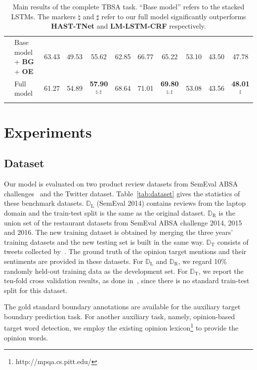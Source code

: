 \documentclass[letterpaper]{article}
\begin{document}
\begin{table}[]
\begin{tabular}{ll|ccc|ccc|ccc}
        & Base model + \textbf{BG} + \textbf{OE} & 63.43 & 49.53 & 55.62 & 62.85 & 66.77 & 65.22 & 53.10 & 43.50 & 47.78 \\
        & Full model & 61.27 & 54.89 & \textbf{57.90}$^{\natural,\sharp}$ & 68.64 & 71.01 & \textbf{69.80}$^{\natural,\sharp}$ & 53.08 & 43.56 & \textbf{48.01}$^{\sharp}$ \\
        \Xhline{3\arrayrulewidth}
    \end{tabular}
    \caption{Main results of the complete TBSA task. ``Base model'' refers to the stacked LSTMs. The markers $\natural$ and $\sharp$ refer to our full model significantly outperforms \textbf{HAST-TNet} and \textbf{LM-LSTM-CRF} respectively.}
    \label{tab:main_results}
\end{table}


\section{Experiments}
\subsection{Dataset}
Our model is evaluated on two product review datasets from SemEval ABSA challenges~\cite{S14-2004,S15-2082,S16-1002} and the Twitter dataset. Table~\ref{tab:dataset} gives the statistics of these benchmark datasets. $\mathbb{D}_{\mathrm{L}}$ (SemEval 2014) contains reviews from the laptop domain and the train-test split is the same as the original dataset. $\mathbb{D}_{\mathrm{R}}$ is the union set of the restaurant datasets from SemEval ABSA challenge 2014, 2015 and 2016. The new training dataset is obtained by merging the three years' training datasets and the new testing set is built in the same way. $\mathbb{D}_{\mathrm{T}}$ consists of tweets collected by~\cite{D13-1171}. The ground truth of the opinion target mentions and their sentiments are provided in these datasets. For $\mathbb{D}_{\mathrm{L}}$ and $\mathbb{D}_{\mathrm{R}}$, we regard 10\% randomly held-out training data as the development set. For $\mathbb{D}_{\mathrm{T}}$, we report the ten-fold cross validation results, as done in~\cite{D13-1171,D15-1073}, since there is no standard train-test split for this dataset. %

The gold standard boundary annotations are available for the auxiliary target boundary prediction task. For another auxiliary task, namely, opinion-based target word detection, we employ the existing opinion lexicon\footnote{http://mpqa.cs.pitt.edu/} to provide the opinion words.
\end{document}
